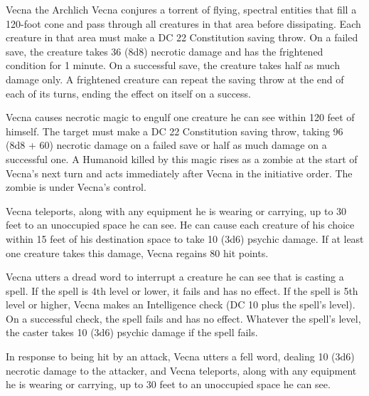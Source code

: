 \documentclass[10pt,a4paper,twoside,bg=print,twocolumn,openany,nodeprecatedcode]{dndbook}
\begin{document}
\begin{DndMonster}[float=t]{Vecna the Archlich}
Vecna conjures a torrent of flying, spectral entities that fill a 120-foot cone and pass through all creatures in that area before dissipating. Each creature in that area must make a DC 22 Constitution saving throw. On a failed save, the creature takes 36 (8d8) necrotic damage and has the frightened condition for 1 minute. On a successful save, the creature takes half as much damage only. A frightened creature can repeat the saving throw at the end of each of its turns, ending the effect on itself on a success.

Vecna causes necrotic magic to engulf one creature he can see within 120 feet of himself. The target must make a DC 22 Constitution saving throw, taking 96 (8d8 + 60) necrotic damage on a failed save or half as much damage on a successful one. A Humanoid killed by this magic rises as a zombie at the start of Vecna's next turn and acts immediately after Vecna in the initiative order. The zombie is under Vecna's control.

Vecna teleports, along with any equipment he is wearing or carrying, up to 30 feet to an unoccupied space he can see. He can cause each creature of his choice within 15 feet of his destination space to take 10 (3d6) psychic damage. If at least one creature takes this damage, Vecna regains 80 hit points.

Vecna utters a dread word to interrupt a creature he can see that is casting a spell. If the spell is 4th level or lower, it fails and has no effect. If the spell is 5th level or higher, Vecna makes an Intelligence check (DC 10 plus the spell's level). On a successful check, the spell fails and has no effect. Whatever the spell's level, the caster takes 10 (3d6) psychic damage if the spell fails.

In response to being hit by an attack, Vecna utters a fell word, dealing 10 (3d6) necrotic damage to the attacker, and Vecna teleports, along with any equipment he is wearing or carrying, up to 30 feet to an unoccupied space he can see.

\end{DndMonster}
\end{document}
